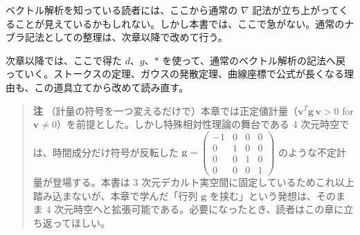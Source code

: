\documentclass[a4paper,12pt,openany]{book}
\begin{document}
ベクトル解析を知っている読者には、ここから通常の \(\nabla\)
記法が立ち上がってくることが見えているかもしれない。しかし本書では、ここで急がない。通常のナブラ記法としての整理は、次章以降で改めて行う。

次章以降では、ここで得た \(d\)、\(g\)、\(\ast\)
を使って、通常のベクトル解析の記法へ戻っていく。ストークスの定理、ガウスの発散定理、曲線座標で公式が長くなる理由も、この道具立てから改めて読み直す。

\begin{quote}
\textbf{注}
（計量の符号を一つ変えるだけで）本章では正定値計量（\(\mathbf{v}^T \mathbf{g} \,\mathbf{v} > 0\)
for
\(\mathbf{v} \neq 0\)）を前提とした。しかし特殊相対性理論の舞台である
\(4\) 次元時空では、時間成分だけ符号が反転した
\(\mathbf{g} = \begin{pmatrix} -1 & 0 & 0 & 0 \\ 0 & 1 & 0 & 0 \\ 0 & 0 & 1 & 0 \\ 0 & 0 & 0 & 1 \end{pmatrix}\)
のような不定計量が登場する。本書は \(3\)
次元デカルト実空間に固定しているためこれ以上踏み込まないが、本章で学んだ「行列
\(\mathbf{g}\) を挟む」という発想は、そのまま \(4\)
次元時空へと拡張可能である。必要になったとき、読者はこの章に立ち返ってほしい。
\end{quote}

\par\vspace{0.35em}\par
\end{document}
